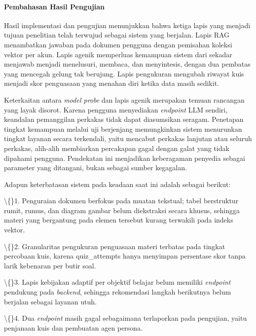 \documentclass[12pt,a4paper]{article}
\begin{document}
\paragraph*{Pembahasan Hasil Pengujian}

Hasil implementasi dan pengujian menunjukkan bahwa ketiga lapis yang menjadi tujuan penelitian telah terwujud sebagai sistem yang berjalan. Lapis RAG menambatkan jawaban pada dokumen pengguna dengan pemisahan koleksi vektor per akun. Lapis agenik memperluas kemampuan sistem dari sekadar menjawab menjadi menelusuri, membaca, dan menyintesis, dengan dua pembatas yang mencegah gelung tak berujung. Lapis pengukuran mengubah riwayat kuis menjadi skor penguasaan yang menahan diri ketika data masih sedikit.



Keterkaitan antara \textit{model probe} dan lapis agenik merupakan temuan rancangan yang layak disorot. Karena pengguna menyediakan \textit{endpoint} LLM sendiri, keandalan pemanggilan perkakas tidak dapat diasumsikan seragam. Penetapan tingkat kemampuan melalui uji berjenjang memungkinkan sistem menurunkan tingkat layanan secara terkendali, yaitu mencabut perkakas lanjutan atau seluruh perkakas, alih-alih membiarkan percakapan gagal dengan galat yang tidak dipahami pengguna. Pendekatan ini menjadikan keberagaman penyedia sebagai parameter yang ditangani, bukan sebagai sumber kegagalan.



Adapun keterbatasan sistem pada keadaan saat ini adalah sebagai berikut:



\textbackslash\{\}1. Penguraian dokumen berfokus pada muatan tekstual; tabel berstruktur rumit, rumus, dan diagram gambar belum diekstraksi secara khusus, sehingga materi yang bergantung pada elemen tersebut kurang terwakili pada indeks vektor.



\textbackslash\{\}2. Granularitas pengukuran penguasaan materi terbatas pada tingkat percobaan kuis, karena quiz\_attempts hanya menyimpan persentase skor tanpa larik kebenaran per butir soal.



\textbackslash\{\}3. Lapis kebijakan adaptif per objektif belajar belum memiliki \textit{endpoint} pendukung pada \textit{backend}, sehingga rekomendasi langkah berikutnya belum berjalan sebagai layanan utuh.



\textbackslash\{\}4. Dua \textit{endpoint} masih gagal sebagaimana terlaporkan pada pengujian, yaitu penjanaan kuis dan pembuatan agen persona.
\end{document}

